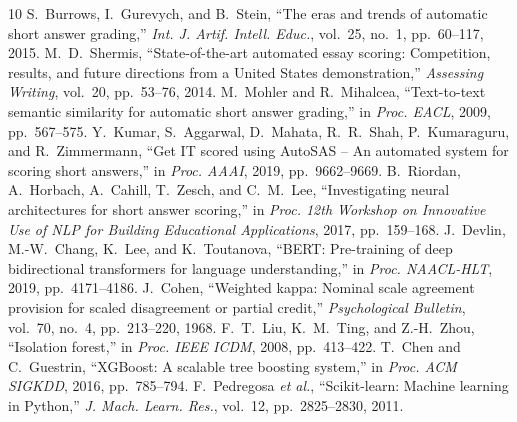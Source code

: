 \documentclass[conference]{IEEEtran}
\begin{document}
\begin{thebibliography}{10}
 S.~Burrows, I.~Gurevych, and B.~Stein, ``The eras and trends of automatic short answer grading,'' \emph{Int. J. Artif. Intell. Educ.}, vol.~25, no.~1, pp.~60--117, 2015.
 M.~D.~Shermis, ``State-of-the-art automated essay scoring: Competition, results, and future directions from a United States demonstration,'' \emph{Assessing Writing}, vol.~20, pp.~53--76, 2014.
 M.~Mohler and R.~Mihalcea, ``Text-to-text semantic similarity for automatic short answer grading,'' in \emph{Proc. EACL}, 2009, pp.~567--575.
 Y.~Kumar, S.~Aggarwal, D.~Mahata, R.~R.~Shah, P.~Kumaraguru, and R.~Zimmermann, ``Get IT scored using AutoSAS -- An automated system for scoring short answers,'' in \emph{Proc. AAAI}, 2019, pp.~9662--9669.
 B.~Riordan, A.~Horbach, A.~Cahill, T.~Zesch, and C.~M.~Lee, ``Investigating neural architectures for short answer scoring,'' in \emph{Proc. 12th Workshop on Innovative Use of NLP for Building Educational Applications}, 2017, pp.~159--168.
 J.~Devlin, M.-W.~Chang, K.~Lee, and K.~Toutanova, ``BERT: Pre-training of deep bidirectional transformers for language understanding,'' in \emph{Proc. NAACL-HLT}, 2019, pp.~4171--4186.
 J.~Cohen, ``Weighted kappa: Nominal scale agreement provision for scaled disagreement or partial credit,'' \emph{Psychological Bulletin}, vol.~70, no.~4, pp.~213--220, 1968.
 F.~T.~Liu, K.~M.~Ting, and Z.-H.~Zhou, ``Isolation forest,'' in \emph{Proc. IEEE ICDM}, 2008, pp.~413--422.
 T.~Chen and C.~Guestrin, ``XGBoost: A scalable tree boosting system,'' in \emph{Proc. ACM SIGKDD}, 2016, pp.~785--794.
 F.~Pedregosa \emph{et al.}, ``Scikit-learn: Machine learning in Python,'' \emph{J. Mach. Learn. Res.}, vol.~12, pp.~2825--2830, 2011.
\end{thebibliography}
\end{document}

